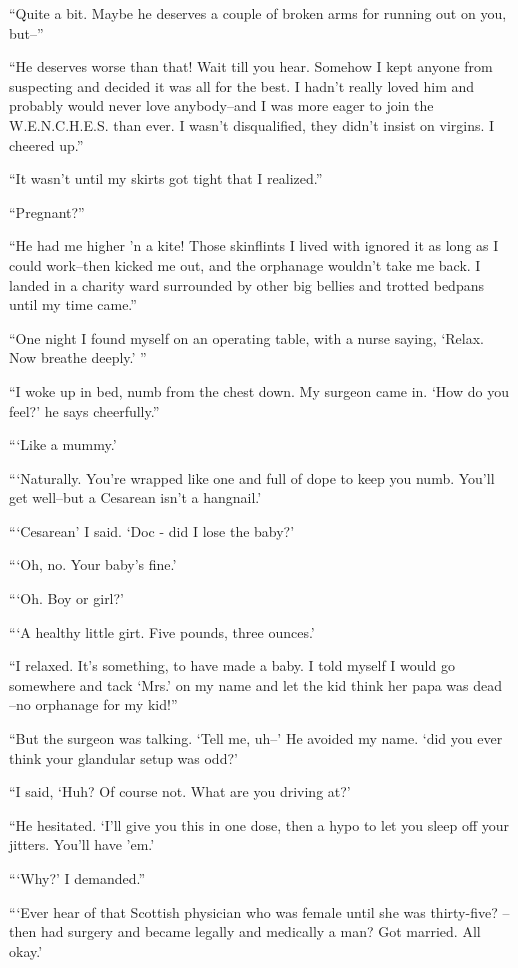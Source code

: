 ``Quite a bit. Maybe he deserves a couple of broken arms for running out on you,
but--''

``He deserves worse  than  that!  Wait  till  you  hear.
Somehow  I  kept  anyone from suspecting and decided it was all
for the best. I hadn't really  loved  him  and  probably  would
never  love  anybody--and I was more eager to join the W.E.N.C.H.E.S.
than ever. I wasn't disqualified, they  didn't  insist
on virgins. I cheered up.''

``It  wasn't  until my skirts got tight that I realized.''

``Pregnant?''

``He had me higher 'n a kite! Those skinflints I lived with ignored it as long
as I could work--then kicked me out, and
the orphanage wouldn't take me back. I landed in a charity ward
surrounded  by  other  big bellies and trotted bedpans until my
time came.''

``One night I found myself on an operating table, with a
nurse saying, `Relax. Now breathe deeply.' ''

``I woke up in bed, numb from the chest down. My surgeon came in.
`How do you feel?' he says cheerfully.''

```Like a mummy.'

```Naturally. You're wrapped like one and full of dope to
keep you numb. You'll get well--but a Cesarean isn't a hangnail.'

```Cesarean' I said. `Doc - did I lose the baby?'

```Oh, no. Your baby's fine.'

```Oh. Boy or girl?'

```A healthy little girt. Five pounds, three ounces.'

``I relaxed. It's something, to have made a baby. I told
myself I would go somewhere and tack `Mrs.' on my name and let
the kid think her papa was dead --no orphanage for my kid!''

``But the  surgeon  was  talking.  `Tell  me,  uh--'  He
avoided  my  name. `did you ever think your glandular setup was
odd?'

``I said, `Huh? Of course not. What are you driving  at?'

``He  hesitated. `I'll give you this in one dose, then a
hypo to let you sleep off your jitters. You'll have 'em.'

```Why?' I demanded.''

```Ever hear of that Scottish  physician  who  was  female
until she was thirty-five? --then had surgery and became legally
and medically a man? Got married. All okay.'

